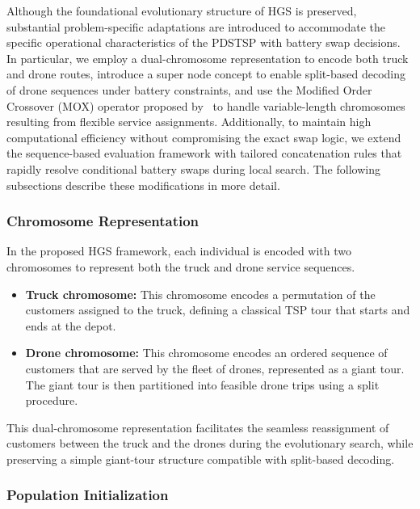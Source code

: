 \documentclass[3p, authoryear, 11pt]{elsarticle}
\begin{document}
Although the foundational evolutionary structure of HGS is preserved, substantial problem-specific adaptations are introduced to accommodate the specific operational characteristics of the PDSTSP with battery swap decisions. 
In particular, we employ a dual-chromosome representation to encode both truck and drone routes, introduce a super node concept to enable split-based decoding of drone sequences under battery constraints, and use the Modified Order Crossover (MOX) operator proposed by~\citet{pham_solving_2017} to handle variable-length chromosomes resulting from flexible service assignments. Additionally, to maintain high computational efficiency without compromising the exact swap logic, we extend the sequence-based evaluation framework with tailored concatenation rules that rapidly resolve conditional battery swaps during local search.
The following subsections describe these modifications in more detail.

\subsubsection{Chromosome Representation}

In the proposed HGS framework, each individual is encoded with two chromosomes to represent both the truck and drone service sequences.

\begin{itemize}
    \item \textbf{Truck chromosome:} This chromosome encodes a permutation of the customers assigned to the truck, defining a classical TSP tour that starts and ends at the depot.
    
    \item \textbf{Drone chromosome:} This chromosome encodes an ordered sequence of customers that are served by the fleet of drones, represented as a giant tour. The giant tour is then partitioned into feasible drone trips using a split procedure.     
\end{itemize}

This dual-chromosome representation facilitates the seamless reassignment of customers between the truck and the drones during the evolutionary search, while preserving a simple giant-tour structure compatible with split-based decoding.

\subsubsection{Population Initialization}
\end{document}
